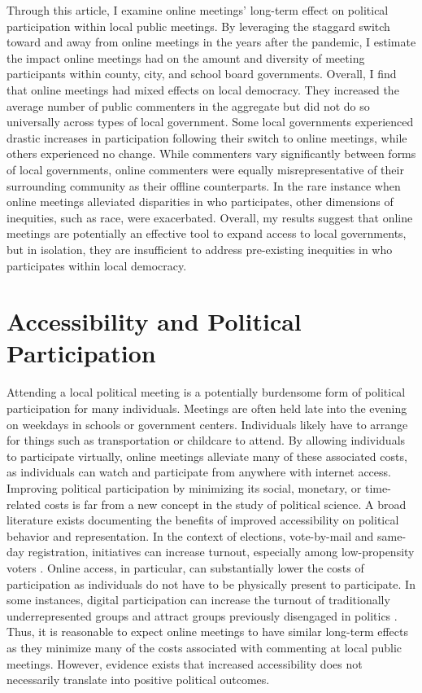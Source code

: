     Through this article, I examine online meetings' long-term effect on political participation within local public meetings. By leveraging the staggard switch toward and away from online meetings in the years after the pandemic, I estimate the impact online meetings had on the amount and diversity of meeting participants within county, city, and school board governments. Overall, I find that online meetings had mixed effects on local democracy. They increased the average number of public commenters in the aggregate but did not do so universally across types of local government. Some local governments experienced drastic increases in participation following their switch to online meetings, while others experienced no change. While commenters vary significantly between forms of local governments, online commenters were equally misrepresentative of their surrounding community as their offline counterparts. In the rare instance when online meetings alleviated disparities in who participates, other dimensions of inequities, such as race, were exacerbated. Overall, my results suggest that online meetings are potentially an effective tool to expand access to local governments, but in isolation, they are insufficient to address pre-existing inequities in who participates within local democracy.

    \section{Accessibility and Political Participation}
    Attending a local political meeting is a potentially burdensome form of political participation for many individuals. Meetings are often held late into the evening on weekdays in schools or government centers. Individuals likely have to arrange for things such as transportation or childcare to attend. By allowing individuals to participate virtually, online meetings alleviate many of these associated costs, as individuals can watch and participate from anywhere with internet access. Improving political participation by minimizing its social, monetary, or time-related costs is far from a new concept in the study of political science. A broad literature exists documenting the benefits of improved accessibility on political behavior and representation. In the context of elections, vote-by-mail and same-day registration, initiatives can increase turnout, especially among low-propensity voters \citep{barberParticipatoryPartisanImpacts2020,bonicaAllmailVotingColorado2021}. Online access, in particular, can substantially lower the costs of participation as individuals do not have to be physically present to participate. In some instances, digital participation can increase the turnout of traditionally underrepresented groups and attract groups previously disengaged in politics \citep{kruegerAssessingPotentialInternet2002,daltonParticipationGapSocial2017}. Thus, it is reasonable to expect online meetings to have similar long-term effects as they minimize many of the costs associated with commenting at local public meetings. However, evidence exists that increased accessibility does not necessarily translate into positive political outcomes.


